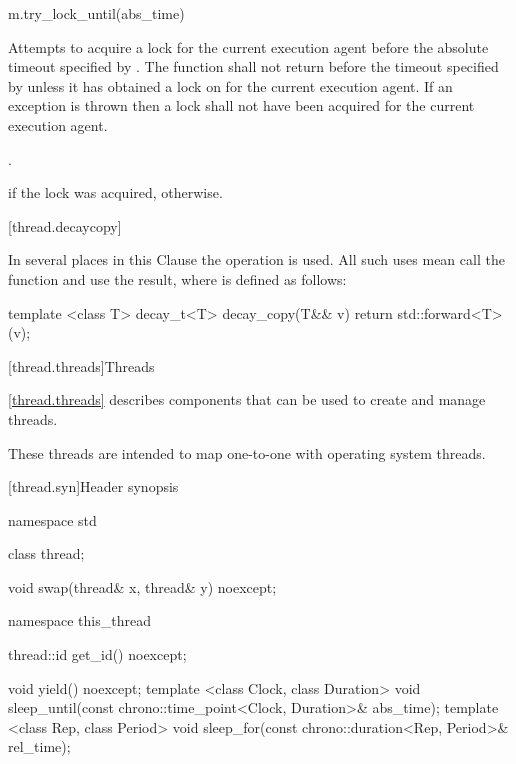 \begin{itemdecl}
m.try_lock_until(abs_time)
\end{itemdecl}

\begin{itemdescr}
\pnum
\effects Attempts to acquire a lock for the current execution agent before the absolute
timeout specified by . The function shall not return
before the timeout specified by  unless it has obtained a lock on  for
the current execution agent. If an exception is thrown then a lock shall not have been acquired
for the current execution agent.

\pnum
\returntype {}.

\pnum
\returns {} if the lock was acquired,  otherwise.
\end{itemdescr}

[thread.decaycopy]{}

\pnum
In several places in this Clause the operation
%
%
{} is used. All
such uses mean call the function  and use the
result, where  is defined as follows:

\begin{codeblock}
template <class T> decay_t<T> decay_copy(T&& v)
  { return std::forward<T>(v); }
\end{codeblock}

[thread.threads]{Threads}

\pnum
\ref{thread.threads} describes components that can be used to create and manage threads.
\begin{note} These threads are intended to map one-to-one with operating system threads.
\end{note}

[thread.syn]{Header  synopsis}
%
%

\begin{codeblock}
namespace std {
  class thread;

  void swap(thread& x, thread& y) noexcept;

  namespace this_thread {
    thread::id get_id() noexcept;

    void yield() noexcept;
    template <class Clock, class Duration>
      void sleep_until(const chrono::time_point<Clock, Duration>& abs_time);
    template <class Rep, class Period>
      void sleep_for(const chrono::duration<Rep, Period>& rel_time);
  }
}
\end{codeblock}

